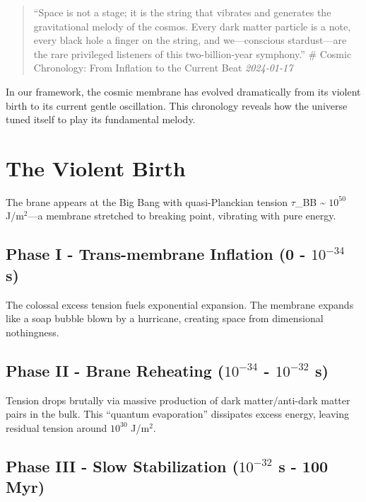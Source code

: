 \documentclass[
  11pt,
]{report}
\begin{document}
\begin{quote}
``Space is not a stage; it is the string that vibrates and generates the
gravitational melody of the cosmos. Every dark matter particle is a
note, every black hole a finger on the string, and we---conscious
stardust---are the rare privileged listeners of this two-billion-year
symphony.'' \newpage \# Cosmic Chronology: From Inflation to the Current
Beat \emph{2024-01-17}
\end{quote}

In our framework, the cosmic membrane has evolved dramatically from its
violent birth to its current gentle oscillation. This chronology reveals
how the universe tuned itself to play its fundamental melody.

\section{The Violent Birth}\label{the-violent-birth-1}

The brane appears at the Big Bang with quasi-Planckian tension
\(\tau\)\_BB \textasciitilde{} \(10^{50}\) J/m\(^2\)---a membrane
stretched to breaking point, vibrating with pure energy.

\subsection{\texorpdfstring{Phase I - Trans-membrane Inflation (0 -
\(10^{-34}\)
s)}{Phase I - Trans-membrane Inflation (0 - 10\^{}\{-34\} s)}}\label{phase-i---trans-membrane-inflation-0---10-34-s}

The colossal excess tension fuels exponential expansion. The membrane
expands like a soap bubble blown by a hurricane, creating space from
dimensional nothingness.

\subsection{\texorpdfstring{Phase II - Brane Reheating (\(10^{-34}\) -
\(10^{-32}\)
s)}{Phase II - Brane Reheating (10\^{}\{-34\} - 10\^{}\{-32\} s)}}\label{phase-ii---brane-reheating-10-34---10-32-s}

Tension drops brutally via massive production of dark matter/anti-dark
matter pairs in the bulk. This ``quantum evaporation'' dissipates excess
energy, leaving residual tension around \(10^{30}\) J/m\(^2\).

\subsection{\texorpdfstring{Phase III - Slow Stabilization (\(10^{-32}\)
s - 100
Myr)}{Phase III - Slow Stabilization (10\^{}\{-32\} s - 100 Myr)}}\label{phase-iii---slow-stabilization-10-32-s---100-myr}
\end{document}
